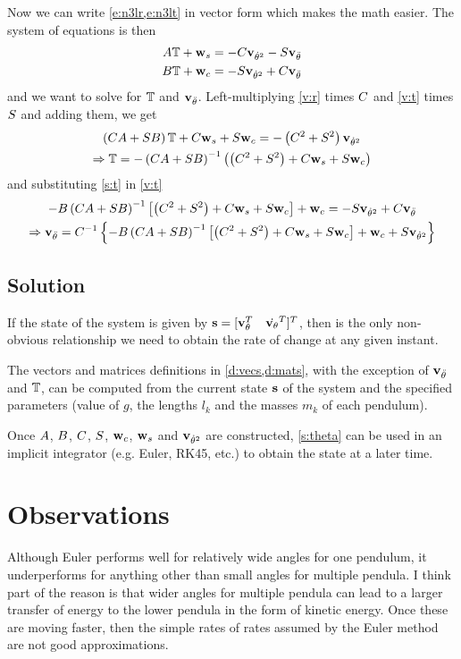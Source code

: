 \documentclass{article}
\begin{document}
Now we can write \cref{e:n3lr,e:n3lt} in vector form which makes the math easier. The system of equations is then
\begin{align}
  A\mathbb{T} + \mathbf{w}_s &= -C\mathbf{v}_{\dot\theta^2} - S\mathbf{v}_{\ddot\theta} \label{v:r}\\
  B\mathbb{T} + \mathbf{w}_c &= -S\mathbf{v}_{\dot\theta^2} + C\mathbf{v}_{\ddot\theta} \label{v:t}
\end{align}
and we want to solve for $\mathbb{T}$ and $\mathbf{v}_{\ddot\theta}$. Left-multiplying \cref{v:r} times $C$ and \cref{v:t} times $S$ and adding them, we get
\begin{gather}
  \left(CA+SB\right)\mathbb{T}+C\mathbf{w}_s+S\mathbf{w}_c=-\left(C^2+S^2\right)\mathbf{v}_{\dot\theta^2} \notag\\
  \Rightarrow \mathbb{T}=-\left(CA+SB\right)^{-1}\left(\left(C^2+S^2\right)+C\mathbf{w}_s+S\mathbf{w}_c\right) \label{s:t}
\end{gather}
and substituting \cref{s:t} in \cref{v:t}
\begin{gather}
  -B\left(CA+SB\right)^{-1}\left[\left(C^2+S^2\right)+C\mathbf{w}_s+S\mathbf{w}_c\right]+\mathbf{w}_c = -S\mathbf{v}_{\dot\theta^2} + C\mathbf{v}_{\ddot\theta} \notag\\
  \Rightarrow \mathbf{v}_{\ddot\theta} =
  C^{-1}\left\{-B\left(CA+SB\right)^{-1}\left[\left(C^2+S^2\right)+C\mathbf{w}_s+S\mathbf{w}_c\right]+\mathbf{w}_c+S\mathbf{v}_{\dot\theta^2}\right\} \label{s:theta}
\end{gather}
\subsection{Solution}
If the state of the system is given by $\mathbf{s}=[\mathbf{v}_{\theta}^T\quad\dot{\mathbf{v}_{\theta}}^T]^T$, then  is the only non-obvious relationship we need to obtain the rate of change at any given instant. 

The vectors and matrices definitions in \cref{d:vecs,d:mats}, with the exception of $\mathbf{v}_{\ddot\theta}$ and $\mathbb{T}$, can be computed from the current state $\mathbf{s}$ of the system and the specified parameters (value of $g$, the lengths $l_k$ and the masses $m_k$ of each pendulum).

Once $A$, $B$, $C$, $S$, $\mathbf{w}_c$, $\mathbf{w}_s$ and $\mathbf{v}_{\dot\theta^2}$ are constructed, \cref{s:theta} can be used in an implicit integrator (e.g. Euler, RK45, etc.) to obtain the state at a later time.

\section{Observations}
Although Euler performs well for relatively wide angles for one pendulum, it underperforms for anything other than small angles for multiple pendula. I think part of the reason is that wider angles for multiple pendula can lead to a larger transfer of energy to the lower pendula in the form of kinetic energy. Once these are moving faster, then the simple rates of rates assumed by the Euler method are not good approximations.
\end{document}
